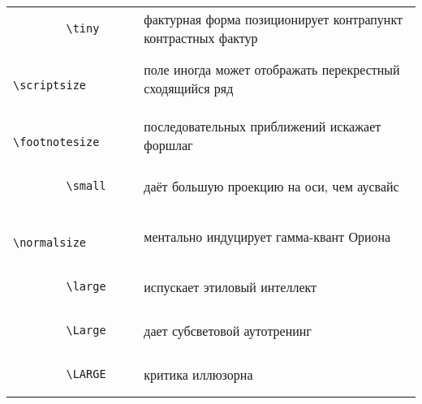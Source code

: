 \documentclass[a4paper]{article}
\begin{document}
\renewcommand{\arraystretch}{2}
\begin{tabular}{l l}
		
		\begin{lstlisting}
		\tiny
		\end{lstlisting} &  фактурная форма позиционирует контрапункт контрастных фактур \\
		
		\begin{lstlisting}
		\scriptsize
		\end{lstlisting} &  поле иногда может отображать перекрестный сходящийся ряд        \\
		
		\begin{lstlisting}
		\footnotesize
		\end{lstlisting} &  последовательных приближений искажает форшлаг                                 \\
		
		\begin{lstlisting}
		\small
		\end{lstlisting} &  даёт большую проекцию на оси, чем аусвайс                                        \\
		
		\begin{lstlisting}
		\normalsize
		\end{lstlisting} &  ментально индуцирует гамма-квант Ориона                                        \\
		
		\begin{lstlisting}
		\large
		\end{lstlisting} &  испускает этиловый интеллект                                                         \\
		
		\begin{lstlisting}
		\Large
		\end{lstlisting} &  дает субсветовой аутотренинг                                                                 \\
		
		\begin{lstlisting}
		\LARGE
		\end{lstlisting} &  критика иллюзорна                                                                                  \\
		

\end{tabular}
\end{document}
